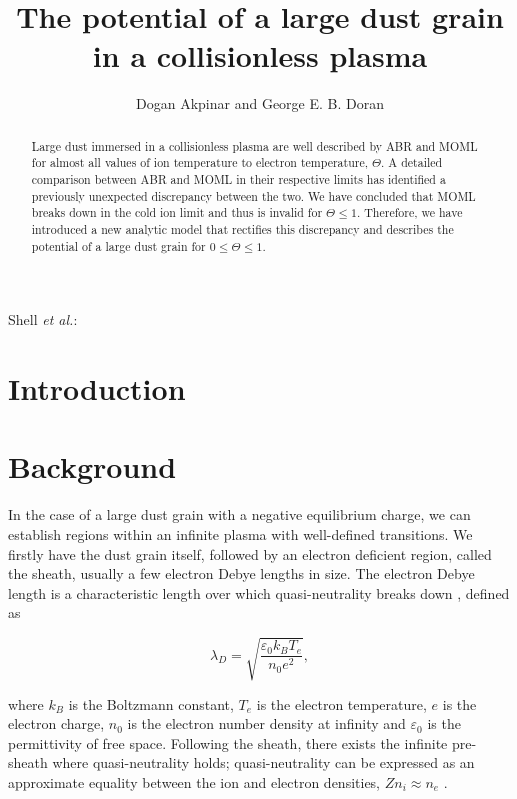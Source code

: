 \documentclass{article}
\begin{document}
\title{The potential of a large dust grain in a collisionless plasma}
\author{Dogan Akpinar and George E. B. Doran}
{Shell \MakeLowercase{\textit{et al.}}:}

\maketitle

\begin{abstract}
    
Large dust immersed in a collisionless plasma are well described 
by ABR and MOML for almost all values of ion temperature to electron temperature, $\Theta$. 
A detailed comparison between ABR and MOML in their respective limits has identified 
a previously unexpected discrepancy between the two. We have concluded that MOML breaks
down in the cold ion limit and thus is invalid for $\Theta \leq 1$. Therefore, we have introduced a new 
analytic model that rectifies this discrepancy and describes the potential 
of a large dust grain for $0 \leq \Theta \leq 1$.

\end{abstract}

\section{Introduction}

\section{Background}

In the case of a large dust grain with a negative equilibrium charge, we can establish regions within an infinite plasma with well-defined
transitions. We firstly have the dust grain itself, followed
by an electron deficient region, called the sheath, usually a few electron Debye lengths
in size. The electron Debye length is a characteristic length over which quasi-neutrality breaks down \cite{DebyeLength} \cite{IntroToPlasmas}, 
defined as

\begin{equation}\label{eq:Debye}
\lambda_D = \sqrt{\frac{\varepsilon_{0} k_{B} T_{e}}{n_{0} e^2}},
\end{equation}

\medskip

\noindent where $k_B$ is the Boltzmann constant, $T_e$ is the electron temperature, $e$ is the 
electron charge, $n_0$ is the electron number density at infinity and $\varepsilon_{0}$ is the
permittivity of free space. Following the sheath, there exists the infinite pre-sheath where quasi-neutrality holds;
quasi-neutrality can be expressed as an approximate equality between the ion and electron
densities, $Zn_i \approx n_e$ \cite{IntroToPlasmas}.
\end{document}
